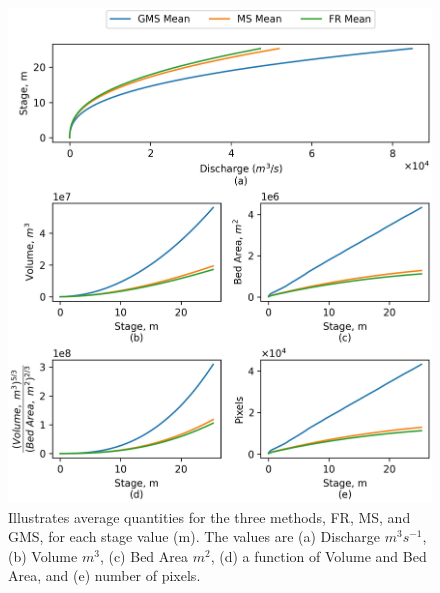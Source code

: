 %
%
\begin{figure}[H]
    \centering
    \includegraphics[scale=1.0]{figures/rating_curve_comparison.jpg}
    \caption{Illustrates average quantities for the three methods, FR, MS, and GMS, for each stage value (m). 
    The values are (a) Discharge $m^3s^{-1}$, (b) Volume $m^3$, (c) Bed Area $m^2$, (d) a function of Volume and Bed Area, and (e) number of pixels.
    }
    \label{fig:rating_curve_comparison}
    \end{figure}
